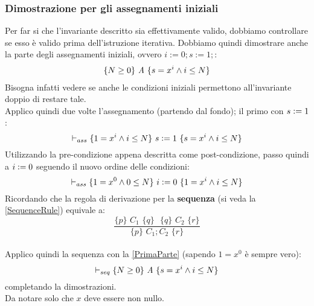 \begin{esempio}
				      				\subsubsection{Dimostrazione per gli assegnamenti iniziali}
				      				Per far si che l'invariante descritto sia effettivamente valido, dobbiamo controllare se esso è valido prima dell'istruzione iterativa.
				      				Dobbiamo quindi dimostrare anche la parte degli assegnamenti iniziali, ovvero $i := 0; s := 1;$:
				      				\begin{align}
				      					\{N\geq 0\}\mbox{ \textit{A} }\{s=x^i\land i\leq N\} 
				      					\label{PrimaParte}                                   
				      				\end{align}
				      				Bisogna infatti vedere se anche le condizioni iniziali permettono
				      				all'invariante doppio di restare tale.\\
				      				Applico quindi due volte l'assegnamento (partendo dal fondo); il primo con
				      				$s\cceq 1$: 
				      				\[\vdash_{ass}\{1=x^i\land i\leq N\}\mbox{ $s\cceq 1$ }\{s=x^i\land i\leq N\}\]
				      				Utilizzando la pre-condizione appena descritta come post-condizione, passo quindi a $i\cceq 0$ seguendo il nuovo ordine delle condizioni:
				      				\[\vdash_{ass}\{1=x^0\land 0\leq N\}\mbox{ $i\cceq 0$ }\{1=x^i\land i\leq N\}\]
				      				Ricordando che la regola di derivazione per la \textbf{sequenza} (si veda la \ref{SequenceRule}) equivale a:   \[\frac{\{p\}\,\,C_1\,\,\{q\}\,\,
				      					\,\,\{q\}\,\,C_2\,\,\{r\}}{\{p\}\,\,C_1;C_2\,\,\{r\}}\] \\Applico quindi la sequenza con la \ref{PrimaParte} (sapendo $1=x^0$ è sempre vero):
				      				\[\vdash_{seq}\{N\geq 0\}\mbox{ \textit{A} }\{s=x^i\land i\leq N\}\]
				      				completando la dimostrazioni.\\
				      				Da notare solo che $x$ deve essere non nullo.
				      				\end{esempio}
